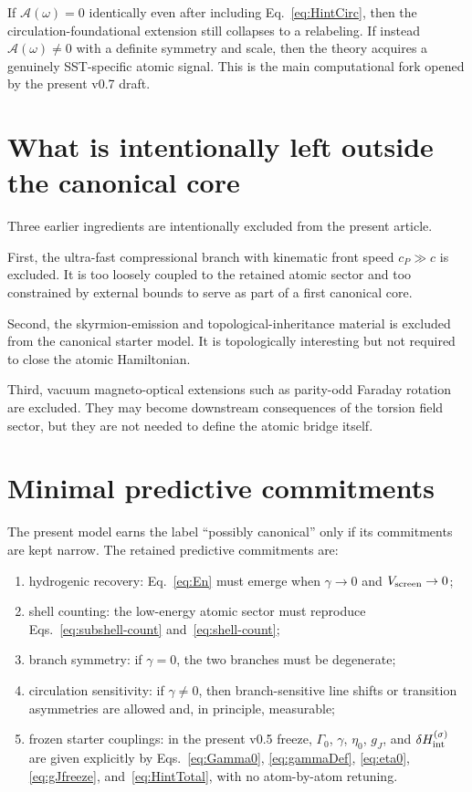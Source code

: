 \documentclass[11pt,a4paper]{article}
\begin{document}
If $\mathcal A(\omega)=0$ identically even after including Eq.~\eqref{eq:HintCirc}, then the circulation-foundational extension still collapses to a relabeling. If instead $\mathcal A(\omega)\neq 0$ with a definite symmetry and scale, then the theory acquires a genuinely SST-specific atomic signal. This is the main computational fork opened by the present v0.7 draft.

\section{What is intentionally left outside the canonical core}
Three earlier ingredients are intentionally excluded from the present article.

First, the ultra-fast compressional branch with kinematic front speed $c_P\gg c$ is excluded. It is too loosely coupled to the retained atomic sector and too constrained by external bounds to serve as part of a first canonical core.

Second, the skyrmion-emission and topological-inheritance material is excluded from the canonical starter model. It is topologically interesting but not required to close the atomic Hamiltonian.

Third, vacuum magneto-optical extensions such as parity-odd Faraday rotation are excluded. They may become downstream consequences of the torsion field sector, but they are not needed to define the atomic bridge itself.

\section{Minimal predictive commitments}
The present model earns the label ``possibly canonical'' only if its commitments are kept narrow. The retained predictive commitments are:
\begin{enumerate}[label=(P\arabic*)]
    \item hydrogenic recovery: Eq.~\eqref{eq:En} must emerge when $\gamma\to 0$ and $V_{\rm screen}\to 0$;
    \item shell counting: the low-energy atomic sector must reproduce Eqs.~\eqref{eq:subshell-count} and~\eqref{eq:shell-count};
    \item branch symmetry: if $\gamma=0$, the two branches must be degenerate;
    \item circulation sensitivity: if $\gamma\neq 0$, then branch-sensitive line shifts or transition asymmetries are allowed and, in principle, measurable;
    \item frozen starter couplings: in the present v0.5 freeze, $\Gamma_0$, $\gamma$, $\eta_0$, $g_J$, and $\delta H_{\rm int}^{(\sigma)}$ are given explicitly by Eqs.~\eqref{eq:Gamma0}, \eqref{eq:gammaDef}, \eqref{eq:eta0}, \eqref{eq:gJfreeze}, and~\eqref{eq:HintTotal}, with no atom-by-atom retuning.
\end{enumerate}
\end{document}
